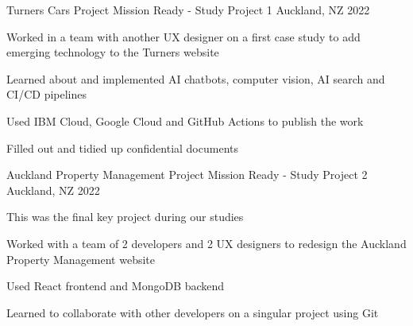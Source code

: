

\begin{cventries}

  \cventry
    {Turners Cars Project} %
    {Mission Ready - Study Project 1} %
    {Auckland, NZ} %
    {2022} %
    {
      \begin{cvitems} %
        \item {Worked in a team with another UX designer on a first case study to add emerging technology to the Turners website}
        \item {Learned about and implemented AI chatbots, computer vision, AI search and CI/CD pipelines}
        \item {Used IBM Cloud, Google Cloud and GitHub Actions to publish the work}
        \item {Filled out and tidied up confidential documents}
      \end{cvitems}
    }

  \cventry
    {Auckland Property Management Project} %
    {Mission Ready - Study Project 2} %
    {Auckland, NZ} %
    {2022} %
    {
      \begin{cvitems} %
        \item {This was the final key project during our studies}
        \item {Worked with a team of 2 developers and 2 UX designers to redesign the Auckland Property Management website}
        \item {Used React frontend and MongoDB backend}
        \item {Learned to collaborate with other developers on a singular project using Git}
      \end{cvitems}
    }


\end{cventries}
